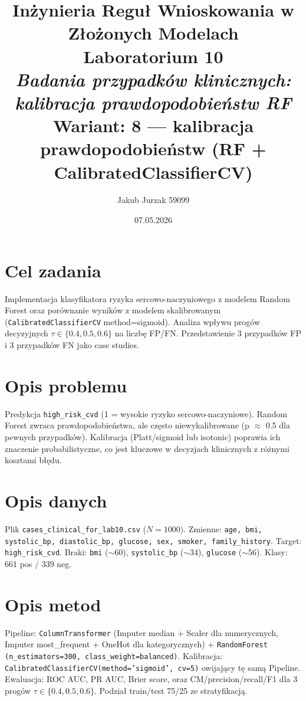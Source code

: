\documentclass[12pt,a4paper]{article}
\title{
  \vspace{2cm}
  \LARGE\textbf{Inżynieria Reguł Wnioskowania w Złożonych Modelach}\\[0.6cm]
  \Large Laboratorium 10\\[0.4cm]
  \large \textit{Badania przypadków klinicznych: kalibracja prawdopodobieństw RF}\\[0.3cm]
  \normalsize Wariant: \textbf{8 — kalibracja prawdopodobieństw (RF + CalibratedClassifierCV)}
}
\author{Jakub Jurzak 59099}
\date{07.05.2026}
\begin{document}
\maketitle
\thispagestyle{empty}
\newpage

\tableofcontents
\newpage

\section{Cel zadania}
Implementacja klasyfikatora ryzyka sercowo-naczyniowego z modelem Random Forest oraz porównanie wyników z modelem skalibrowanym (\texttt{CalibratedClassifierCV} method=sigmoid). Analiza wpływu progów decyzyjnych $\tau \in \{0.4, 0.5, 0.6\}$ na liczbę FP/FN. Przedstawienie 3 przypadków FP i 3 przypadków FN jako case studies.

\section{Opis problemu}
Predykcja \texttt{high\_risk\_cvd} (1 = wysokie ryzyko sercowo-naczyniowe). Random Forest zwraca prawdopodobieństwa, ale często niewykalibrowane (p $\approx$ 0.5 dla pewnych przypadków). Kalibracja (Platt/sigmoid lub isotonic) poprawia ich znaczenie probabilistyczne, co jest kluczowe w decyzjach klinicznych z różnymi kosztami błędu.

\section{Opis danych}
Plik \texttt{cases\_clinical\_for\_lab10.csv} ($N=1000$). Zmienne: \texttt{age, bmi, systolic\_bp, diastolic\_bp, glucose, sex, smoker, family\_history}. Target: \texttt{high\_risk\_cvd}. Braki: \texttt{bmi} ($\sim$60), \texttt{systolic\_bp} ($\sim$34), \texttt{glucose} ($\sim$56). Klasy: 661 pos / 339 neg.

\section{Opis metod}
Pipeline: \texttt{ColumnTransformer} (Imputer median + Scaler dla numerycznych, Imputer most\_frequent + OneHot dla kategorycznych) + \texttt{RandomForest (n\_estimators=300, class\_weight=balanced)}. Kalibracja: \texttt{CalibratedClassifierCV(method='sigmoid', cv=5)} owijający tę samą Pipeline. Ewaluacja: ROC AUC, PR AUC, Brier score, oraz CM/precision/recall/F1 dla 3 progów $\tau \in \{0.4, 0.5, 0.6\}$. Podział train/test 75/25 ze stratyfikacją.
\end{document}
